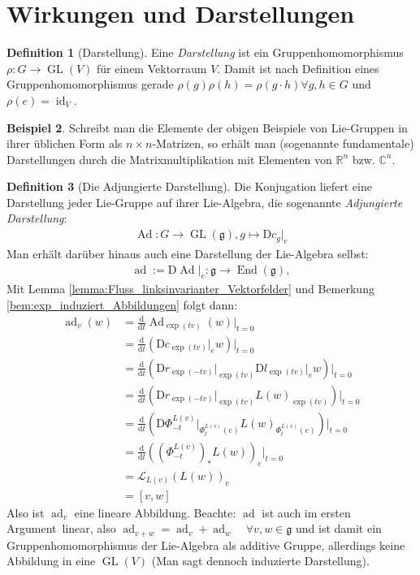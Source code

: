\documentclass[a4paper]{scrreprt}
\numberwithin{equation}{chapter}
\newcommand{\D}{\mathrm{d}}
\newcommand{\DD}{\mathrm{D}}
\DeclareMathOperator{\id}{id}
\DeclareMathOperator{\GL}{GL}
\DeclareMathOperator{\End}{End}
\DeclareMathOperator{\Ad}{Ad}
\DeclareMathOperator{\ad}{ad}
\newcommand{\R}{\mathbb{R}}
\theoremstyle{definition}
\newtheorem{defn}{Definition}[section]
\newtheorem{bsp}[defn]{Beispiel}
\begin{document}
	\section{Wirkungen und Darstellungen}
		\begin{defn}[Darstellung]
			Eine \emph{Darstellung} ist ein Gruppenhomomorphismus $\rho\colon G\rightarrow \GL(V)$ für einem Vektorraum $V$. Damit ist nach Definition eines Gruppenhomomorphismus gerade $\rho(g)\rho(h)=\rho(g\cdot h) \forall g,h\in G$ und $\rho(e)=\id_V$.
		\end{defn}
		\begin{bsp}
			Schreibt man die Elemente der obigen Beispiele von Lie-Gruppen in ihrer üblichen Form als $n\times n$-Matrizen, so erhält man (sogenannte fundamentale) Darstellungen durch die Matrixmultiplikation mit Elementen von $\R^n$ bzw. $\mathbb{C}^n$.
		\end{bsp}
		\begin{defn}[Die Adjungierte Darstellung]\hfill
			
			Die Konjugation liefert eine Darstellung jeder Lie-Gruppe auf ihrer Lie-Algebra, die sogenannte \emph{Adjungierte Darstellung}:
			\begin{align*}
				\Ad\colon G\rightarrow \GL(\mathfrak{g}), g\mapsto \DD c_g\vert_e
			\end{align*}
			Man erhält darüber hinaus auch eine Darstellung der Lie-Algebra selbst:
			\begin{align*}
				\ad:=\DD\Ad\vert_e\colon\mathfrak{g}\rightarrow\End(\mathfrak{g}),
			\end{align*}
			Mit Lemma \ref{lemma:Fluss_linksinvarianter_Vektorfelder} und Bemerkung \ref{bem:exp_induziert_Abbildungen} folgt dann:
			\begin{align*}
				\ad_v(w)&=\frac{\D}{\D t} \Ad_{\exp(tv)}(w)\Big\vert_{t=0}\\
				&=\frac{\D}{\D t} \left(\DD c_{\exp(tv)}\vert_e w\right)\Big\vert_{t=0}\\
				&=\frac{\D}{\D t} \left(\DD r_{\exp(-tv)}\vert_{\exp(tv)}\DD l_{\exp(tv)}\vert_e w\right)\Big\vert_{t=0}\\
				&=\frac{\D}{\D t} \left(\DD r_{\exp(-tv)}\vert_{\exp(tv)}L(w)_{\exp(tv)}\right)\Big\vert_{t=0}\\
				&=\frac{\D}{\D t} \left(\DD \Phi_{-t}^{L(v)}\vert_{\Phi^{L(v)}_t(e)}L(w)_{\Phi^{L(v)}_t(e)}\right)\Big\vert_{t=0}\\
				&=\frac{\D}{\D t} \left(\left(\Phi_{-t}^{L(v)}\right)_*L(w)\right)_e\Big\vert_{t=0}\\
				&=\mathcal{L}_{L(v)}(L(w))_e\\
				&=\left[v,w\right]
			\end{align*}
			Also ist $\ad_v$ eine lineare Abbildung. Beachte: $\ad$ ist auch \glqq im ersten Argument\grqq\ linear, also $\ad_{v+w}=\ad_v+\ad_w \quad\forall v,w\in\mathfrak{g}$ und ist damit ein Gruppenhomomorphismus der Lie-Algebra als additive Gruppe, allerdings keine Abbildung in eine $\GL(V)$ (Man sagt dennoch \glqq induzierte Darstellung\grqq).
		\end{defn}
\end{document}
